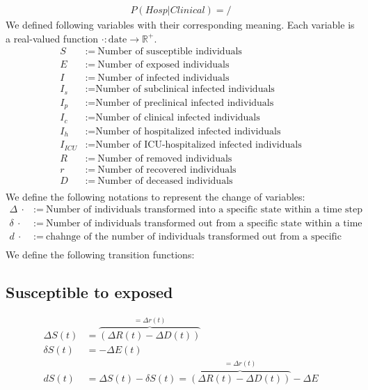 \documentclass[12pt]{article}
\newcommand{\R}{\mathbb R}
\newcommand{\vect}[1]{\left( #1 \right)}
\begin{document}
\begin{align*}
    P(Hosp|Clinical) = /
\end{align*}
We defined following variables with their corresponding meaning. Each variable is a real-valued function $\cdot: \text{date} \to \R^+$.
\begin{align*}
    S & := \ \text{Number of susceptible individuals}\\
    E & := \ \text{Number of exposed individuals}\\
    I & := \ \text{Number of infected individuals}\\
    I_s &:= \text{Number of subclinical infected individuals}\\
    I_p &:= \text{Number of preclinical infected individuals}\\
    I_c &:= \text{Number of clinical infected individuals}\\
    I_h &:= \text{Number of hospitalized infected individuals}\\
    I_{ICU} &:= \text{Number of ICU-hospitalized infected individuals}\\
    R & := \ \text{Number of removed individuals}\\
    r & := \ \text{Number of recovered individuals}\\
    D & := \ \text{Number of deceased individuals}\\ 
\end{align*}
We define the following notations to represent the change of variables:
\begin{align*}
    \Delta \ \cdot &:= \ \text{Number of individuals transformed into a specific state within a time step}\\
    \delta \ \cdot &:= \ \text{Number of individuals transformed out from a specific state within a time step}\\
    d \ \cdot &:= \ \text{chahnge of the number of individuals transformed out from a specific state within a time step}\\
\end{align*}
We define the following transition functions:
\subsection*{Susceptible to exposed}
\begin{align*}
    \Delta S(t) &= \overbrace{\vect{\Delta R(t) - \Delta D(t)}}^{= \Delta r(t)}\\
    \delta S(t) &= - \Delta E(t)\\
    dS(t) &=  \Delta S(t) - \delta S(t) = \overbrace{\vect{\Delta R(t) - \Delta D(t)}}^{= \Delta r(t)} - \Delta E
\end{align*}
\end{document}
